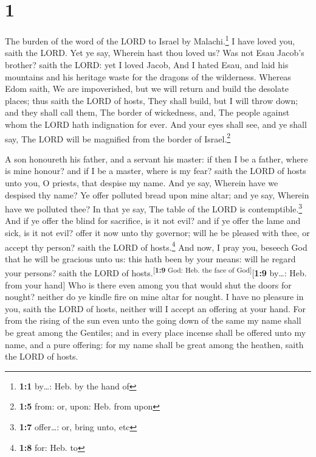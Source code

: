 \hypertarget{section}{%
\section{1}\label{section}}

 The burden of the word of the LORD to Israel by
Malachi.\footnote{\textbf{1:1} by\ldots: Heb. by the hand of}
 I have loved you, saith the LORD. Yet ye say, Wherein
hast thou loved us? Was not Esau Jacob's brother? saith the LORD: yet I
loved Jacob,  And I hated Esau, and laid his mountains and
his heritage waste for the dragons of the wilderness. 
Whereas Edom saith, We are impoverished, but we will return and build
the desolate places; thus saith the LORD of hosts, They shall build, but
I will throw down; and they shall call them, The border of wickedness,
and, The people against whom the LORD hath indignation for ever.
 And your eyes shall see, and ye shall say, The LORD will
be magnified from the border of Israel.\footnote{\textbf{1:5} from: or,
  upon: Heb. from upon}

 A son honoureth his father, and a servant his master: if
then I be a father, where is mine honour? and if I be a master, where is
my fear? saith the LORD of hosts unto you, O priests, that despise my
name. And ye say, Wherein have we despised thy name?  Ye
offer polluted bread upon mine altar; and ye say, Wherein have we
polluted thee? In that ye say, The table of the LORD is
contemptible.\footnote{\textbf{1:7} offer\ldots: or, bring unto, etc}
 And if ye offer the blind for sacrifice, is it not evil?
and if ye offer the lame and sick, is it not evil? offer it now unto thy
governor; will he be pleased with thee, or accept thy person? saith the
LORD of hosts.\footnote{\textbf{1:8} for: Heb. to}  And
now, I pray you, beseech God that he will be gracious unto us: this hath
been by your means: will he regard your persons? saith the LORD of
hosts.\textsuperscript{{[}\textbf{1:9} God: Heb. the face of
God{]}}{[}\textbf{1:9} by\ldots: Heb. from your hand{]} 
Who is there even among you that would shut the doors for nought?
neither do ye kindle fire on mine altar for nought. I have no pleasure
in you, saith the LORD of hosts, neither will I accept an offering at
your hand.  For from the rising of the sun even unto the
going down of the same my name shall be great among the Gentiles; and in
every place incense shall be offered unto my name, and a pure offering:
for my name shall be great among the heathen, saith the LORD of hosts.

